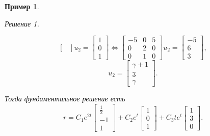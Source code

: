 \documentclass[a5paper, 11pt]{article}
\theoremstyle{definition}
\theoremstyle{plain}
\newtheorem{Ex}{Пример}
\theoremstyle{remark}
\newtheorem*{Solution}{Решение}
\begin{document}
\begin{Ex}
\begin{Solution}
\begin{itemize}
\[\begin{bmatrix}
			\end{bmatrix} u_2 = \begin{bmatrix}
			1\\0\\1
		\end{bmatrix} \Leftrightarrow 
			\begin{bmatrix}
				-5 & 0 & 5\\
				0 & 2 & 0\\
				0 & 1 & 0 
			\end{bmatrix} u_2 = \begin{bmatrix}
			-5 \\ 6 \\ 3
		\end{bmatrix},
			\]
			\[
			u_2 = \begin{bmatrix}
				\gamma +1 \\3\\\gamma
			\end{bmatrix}.
			\]
			\end{itemize}
		Тогда фундаментальное решение есть
		\[
		r = C_1 e^{2t} \begin{bmatrix}
			\frac12\\-1\\1
		\end{bmatrix} + C_2 e^{t} \begin{bmatrix}
		1\\0\\1
	\end{bmatrix} + C_3 t e^t \begin{bmatrix}
	1\\3\\0
\end{bmatrix}.
		\]
		\end{Solution}
	\end{Ex}
\end{document}
